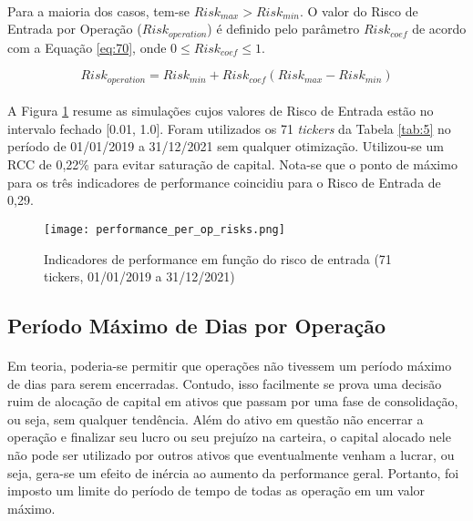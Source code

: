 \paragraph{} Para a maioria dos casos, tem-se \begin{math} Risk_{max} > Risk_{min} \end{math}. O valor do Risco de Entrada por Operação (\begin{math} Risk_{operation} \end{math}) é definido pelo parâmetro \begin{math} Risk_{coef} \end{math} de acordo com a Equação \ref{eq:70}, onde \begin{math} 0 \le Risk_{coef} \le 1 \end{math}.

\begin{equation} \label{eq:70}
    Risk_{operation} = Risk_{min} + Risk_{coef}(Risk_{max} - Risk_{min})
\end{equation}

\paragraph{} A Figura \ref{fig:553} resume as simulações cujos valores de Risco de Entrada estão no intervalo fechado [0.01, 1.0]. Foram utilizados os 71 \textit{tickers} da Tabela \ref{tab:5} no período de 01/01/2019 a 31/12/2021 sem qualquer otimização. Utilizou-se um RCC de 0,22\% para evitar saturação de capital. Nota-se que o ponto de máximo para os três indicadores de performance coincidiu para o Risco de Entrada de 0,29.

\begin{figure}[!htb]
    \texttt{[image: performance\_per\_op\_risks.png]}
    \centering
    \caption{Indicadores de performance em função do risco de entrada (71 tickers, 01/01/2019 a 31/12/2021)}
    \label{fig:553}
\end{figure}



\FloatBarrier
\subsection{Período Máximo de Dias por Operação}
\label{sub:max_op_days}

\paragraph{} Em teoria, poderia-se permitir que operações não tivessem um período máximo de dias para serem encerradas. Contudo, isso facilmente se prova uma decisão ruim de alocação de capital em ativos que passam por uma fase de consolidação, ou seja, sem qualquer tendência. Além do ativo em questão não encerrar a operação e finalizar seu lucro ou seu prejuízo na carteira, o capital alocado nele não pode ser utilizado por outros ativos que eventualmente venham a lucrar, ou seja, gera-se um efeito de inércia ao aumento da performance geral. Portanto, foi imposto um limite do período de tempo de todas as operação em um valor máximo.

